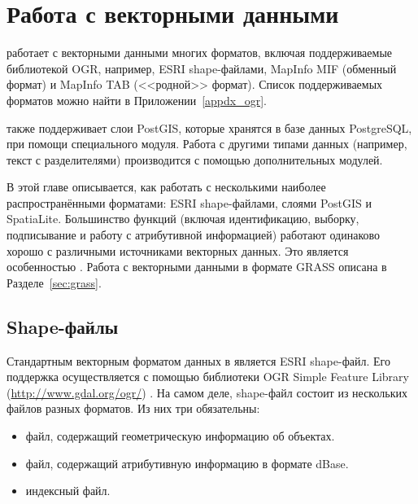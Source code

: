 
\chapter{Работа с векторными данными}\label{label_workingvector}


\qg работает с векторными данными многих форматов, включая
поддерживаемые библиотекой OGR, например, ESRI shape-файлами,
MapInfo MIF (обменный формат)
и MapInfo TAB (<<родной>> формат).
Список поддерживаемых форматов можно найти в Приложении~\ref{appdx_ogr}.

\qg также поддерживает слои PostGIS,
которые хранятся в базе данных PostgreSQL, при помощи специального модуля.
Работа с другими типами данных (например, текст с разделителями)
производится с помощью дополнительных модулей.

В этой главе описывается, как работать с несколькими наиболее
распространёнными форматами: ESRI shape-файлами, слоями PostGIS и SpatiaLite.
Большинство функций \qg (включая идентификацию, выборку, подписывание
и работу с атрибутивной информацией) работают одинаково хорошо с различными
источниками векторных данных. Это является особенностью \qg .
Работа с векторными данными в формате GRASS описана в Разделе~\ref{sec:grass}.

\section{Shape-файлы}

Стандартным векторным форматом данных в \qg является ESRI shape-файл. Его
поддержка осуществляется с помощью библиотеки OGR Simple Feature Library
(\url{http://www.gdal.org/ogr/}) . На самом деле, shape-файл
состоит из нескольких файлов разных форматов. Из них три
обязательны: 

\begin{itemize}[label=--]
\item {} файл, содержащий геометрическую информацию об объектах.
\item {} файл, содержащий атрибутивную информацию в
формате dBase.
\item {} индексный файл.
\end{itemize}

